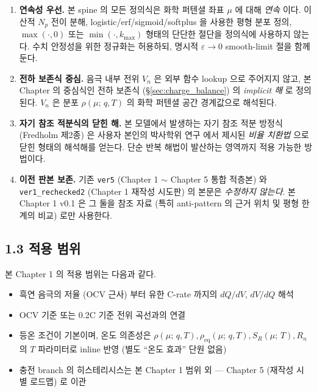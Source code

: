 \documentclass[11pt,a4paper]{article}
\newcommand{\eq}{\mathrm{eq}}
\newcommand{\mucont}{\mu}
\newcommand{\rhomu}{\rho(\mucont;\, q, T)}
\newcommand{\rhoeq}{\rho_{\eq}(\mucont;\, q, T)}
\newcommand{\Sreact}{S_R(\mucont;\, T)}
\begin{document}
\begin{enumerate}[label=\textbf{(P\arabic*)}]
\item \textbf{연속성 우선.} 본 spine 의 모든 정의식은 화학 퍼텐셜 좌표 $\mucont$
      에 대해 \emph{연속} 이다. 이산적 $N_p$ 전이 분해, logistic/erf/sigmoid/softplus
      을 사용한 평형 분포 정의, $\max(\cdot, 0)$ 또는 $\min(\cdot, k_{\max})$
      형태의 단단한 절단을 정의식에 사용하지 않는다. 수치 안정성을 위한 정규화는
      허용하되, 명시적 $\varepsilon \to 0$ smooth-limit 절을 함께 둔다.

\item \textbf{전하 보존식 중심.} 음극 내부 전위 $V_n$ 은 외부 함수 lookup 으로
      주어지지 않고, 본 Chapter 의 중심식인 전하 보존식 (\S\ref{sec:charge_balance})
      의 \emph{implicit 해} 로 정의된다. $V_n$ 은 분포 $\rhomu$ 의 화학 퍼텐셜
      공간 경계값으로 해석된다.

\item \textbf{자기 참조 적분식의 닫힌 해.} 본 모델에서 발생하는 자기 참조 적분
      방정식 (Fredholm 제2종) 은 사용자 본인의 박사학위 연구
      \cite{lee2011propagator, son2013accurate} 에서 제시된 \emph{비율 치환법}
      으로 닫힌 형태의 해석해를 얻는다. 단순 반복 해법이 발산하는 영역까지 적용
      가능한 방법이다.

\item \textbf{이전 판본 보존.} 기존 \texttt{ver5} (Chapter 1 \(\sim\) Chapter 5
      통합 적층본) 와 \texttt{ver1\_rechecked2} (Chapter 1 재작성 시도판) 의 본문은
      \emph{수정하지 않는다}. 본 Chapter 1 v0.1 은 그 둘을 참조 자료 (특히
      anti-pattern 의 근거 위치 및 평형 한계의 비교) 로만 사용한다.
\end{enumerate}

\subsection*{1.3 적용 범위}

본 Chapter 1 의 적용 범위는 다음과 같다.

\begin{itemize}
\item 흑연 음극의 저율 (OCV 근사) 부터 유한 C-rate 까지의 $dQ/dV$, $dV/dQ$ 해석
\item OCV 기준 또는 0.2C 기준 전위 곡선과의 연결
\item 등온 조건이 기본이며, 온도 의존성은 $\rhomu, \rhoeq, \Sreact, R_n$ 의 $T$
      파라미터로 inline 반영 (별도 ``온도 효과'' 단원 없음)
\item 충전 branch 의 히스테리시스는 본 Chapter 1 범위 외 — Chapter 5 (재작성 시
      별 로드맵) 로 이관
\end{itemize}
\end{document}
